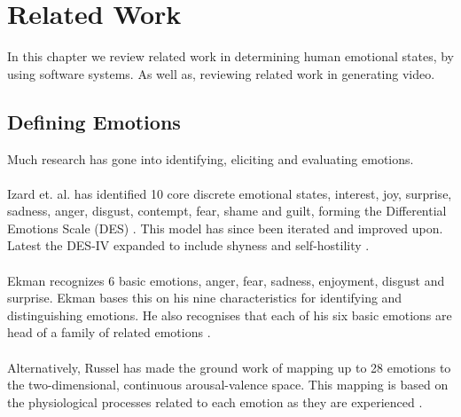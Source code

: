\chapter{Related Work} \label{cap:relatedWork}
In this chapter we review related work in determining human emotional states, by using software systems. As well as, reviewing related work in generating video.

\section{Defining Emotions}\label{sec:defineEmotions}
Much research has gone into identifying, eliciting and evaluating emotions.\\\\
Izard et. al. has identified 10 core discrete emotional states, interest, joy, surprise, sadness, anger, disgust, contempt, fear, shame and guilt, forming the Differential Emotions Scale (DES) \cite{des-boyle, humanemotionsIzard}. This model has since been iterated and improved upon. Latest the DES-IV expanded to include shyness and self-hostility \cite{desiv,desivBoyle}.\\\\
Ekman recognizes 6 basic emotions, anger, fear, sadness, enjoyment, disgust and surprise. Ekman bases this on his nine characteristics for identifying and distinguishing emotions. He also recognises that each of his six basic emotions are head of a family of related emotions \cite{ekman1992argument}.\\\\
Alternatively, Russel has made the ground work of mapping up to 28 emotions to the two-dimensional, continuous arousal-valence space. This mapping is based on the physiological processes related to each emotion as they are experienced \cite{ValArouModelOrg}.

